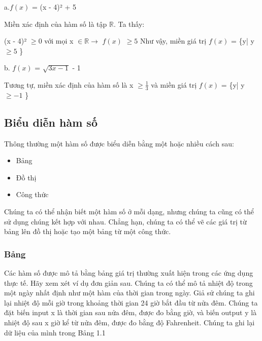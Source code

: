 \documentclass[a4paper,12pt,openany]{book}
\begin{document}
\vspace{10pt}
a.$f(x)$ = (x - 4)² + 5 
\par
\vspace{10pt}
Miền xác định của hàm số là tập \(\mathbb{R}\). Ta thấy: \par
\vspace{10pt}
(x - 4)² \(\geq 0\) với mọi x \(\in \mathbb{R} \rightarrow{}\) $f(x)$ \(\geq 5\) 
Như vậy, miền giá trị  $f(x)$ = \{y| y\(\geq 5\) \} \par
\vspace{10pt}
b. $f(x)$ = \(\sqrt{3x - 1}\) - 1 \par
\vspace{10pt}
Tương tự, miền xác định của hàm số là x \(\geq \frac{1}{3}\) và miền giá trị $f(x)$ = \{y| y\(\geq -1\) \} \par
\vspace{10pt}

\clearpage
\pagestyle{fancy} %
\fancyhf{} %
\fancyhead[L]{} %
\subsection{Biểu diễn hàm số}

Thông thường một hàm số được biểu diễn bằng một hoặc nhiều cách sau:
\begin{itemize} 
\item Bảng 
\item Đồ thị 
\item Công thức 
\end{itemize}
Chúng ta có thể nhận biết một hàm số ở mỗi dạng, nhưng chúng ta cũng có thể sử dụng chúng kết hợp với nhau. Chẳng hạn, chúng ta có thể vẽ các giá trị từ bảng lên đồ thị hoặc tạo một bảng từ một công thức.

\subsubsection{Bảng}
Các hàm số được mô tả bằng bảng giá trị thường xuất hiện trong các ứng dụng thực tế. Hãy xem xét ví dụ đơn giản sau. Chúng ta có thể mô tả nhiệt độ trong một ngày nhất định như một hàm của thời gian trong ngày. Giả sử chúng ta ghi lại nhiệt độ mỗi giờ trong khoảng thời gian 24 giờ bắt đầu từ nửa đêm. Chúng ta đặt biến input x là thời gian sau nửa đêm, được đo bằng giờ, và biến output y là nhiệt độ sau x giờ kể từ nửa đêm, được đo bằng độ Fahrenheit. Chúng ta ghi lại dữ liệu của mình trong Bảng 1.1
\end{document}
